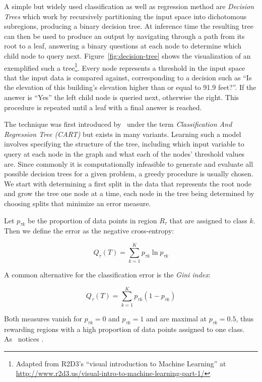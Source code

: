 A simple but widely used classification as well as regression method are \emph{Decision Trees} which work by recursively partitioning the input space into dichotomous subregions, producing a binary decision tree. At inference time the resulting tree can then be used to produce an output by navigating through a path from its root to a leaf, answering a binary questions at each node to determine which child node to query next. Figure~\ref{fig:decision-tree} shows the visualization of an exemplified such a tree\footnote{Adapted from R2D3's ``visual introduction to Machine Learning'' at \url{http://www.r2d3.us/visual-intro-to-machine-learning-part-1/}}.
Every node represents a threshold in the input space that  the input data is compared against, corresponding to a decision such as ``Is the elevation of this building's elevation higher than or equal to 91.9 feet?''. If the answer is ``Yes'' the left child node is queried next, otherwise the right. This procedure is repeated until a leaf with a final answer is reached.

The technique was first introduced by~\cite{Breiman:1984ab} under the term \emph{Classification And Regression Tree (CART)} but exists in many variants. Learning such a model involves specifying the structure of the tree, including which input variable to query at each node in the graph and what each of the nodes' threshold values are. Since commonly it is computationally infeasible to generate and evaluate all possible decision trees for a given problem, a greedy procedure is usually chosen. We start with determining a first split in the data that represents the root node and grow the tree one node at a time, each node in the tree being determined by choosing splits that minimize an error measure.

Let $p_{\tau k}$ be the proportion of data points in region $R_{\tau}$ that are assigned to class $k$. Then we define the error as the negative cross-entropy:

\begin{equation}
  Q_{\tau}(T) = \sum_{k=1}^K p_{\tau k} \ln p_{\tau k}
\end{equation}

A common alternative for the classification error is the \emph{Gini index}:

\begin{equation}
  Q_{\tau}(T) = \sum_{k=1}^K p_{\tau k} (1 - p_{\tau k})
\end{equation}

Both measures vanish for $p_{\tau k} = 0$ and $p_{\tau k} = 1$ and are maximal at $p_{\tau k} = 0.5$, thus rewarding regions with a high proportion of data points assigned to one class. As~\cite[Chapter 14.4, p.~664]{Bishop:2006aa} notices .

